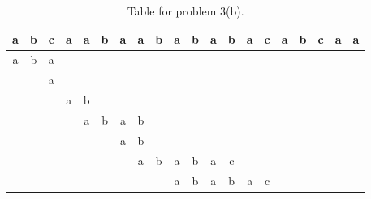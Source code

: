 \documentclass[12pt]{article}
\begin{document}
\begin{table}[h]
\Large{
\begin{center}
\begin{tabular}{|c|c|c|c|c|c|c|c|c|c|c|c|c|c|c|c|c|c|c|c|}
\hline
a&b&c&a&a&b&a&a&b&a&b&a&b&a&c&a&b&c&a&a\\
\hline
a&b&a&&&&&&&&&&&&&&&&&\\
\hline
& &a& & & & & & & & & & & & & & & & & \\
\hline
& & &a&b& & & & & & & & & & & & & & & \\
\hline
& & & &a&b&a&b& & & & & & & & & & & & \\
\hline
& & & & & &a&b& & & & & & & & & & & & \\
\hline
& & & & & & &a&b&a&b&a&c& & & & & & & \\
\hline
& & & & & & & & &a&b&a&b&a&c& & & & & \\
\hline
\end{tabular}
\end{center}}
\caption{Table for problem 3(b).}\label{kmp}
\end{table}

\clearpage
\end{document}
